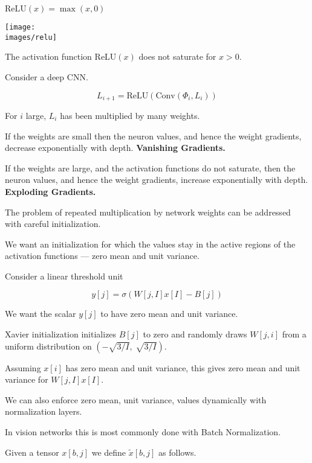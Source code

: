 {$\mathrm{ReLU}(x) = \max(x,0)$

\vfill
\centerline{\texttt{[image: \\images/relu]}}

\vfill
The activation function $\mathrm{ReLU}(x)$ does not saturate for $x > 0$.


Consider a deep CNN.

$$L_{i+1} = \mathrm{ReLU}(\mathrm{Conv}(\Phi_i,L_i))$$

\vfill
For $i$ large, $L_i$ has been multiplied by many weights.

\vfill
If the weights are small then the neuron values, and hence the weight gradients, decrease exponentially with depth. {\bf Vanishing Gradients.}

\vfill
If the weights are large, and the activation functions do not saturate, then the neuron values, and hence the weight gradients,
increase exponentially with depth. {\bf Exploding Gradients.}


The problem of repeated multiplication by network weights can be addressed with careful initialization.

\vfill
We want an initialization for which the values stay in the active regions of the activation functions --- zero mean and unit variance.



Consider a linear threshold unit

\vfill
$$y[j] = \sigma(W[j,I]x[I] - B[j])$$

\vfill
We want the scalar $y[j]$ to have zero mean and unit variance.

\vfill
Xavier initialization initializes $B[j]$ to zero and randomly draws $W[j,i]$ from a uniform distribution on $\left(-\sqrt{3/I},\;\sqrt{3/I}\right)$.

\vfill
Assuming $x[i]$ has zero mean and unit variance, this gives zero mean and unit variance for $W[j,I]x[I]$.


We can also enforce zero mean, unit variance, values dynamically with normalization layers.

\vfill
In vision networks this is most commonly done with Batch Normalization.

Given a tensor $x[b,j]$ we define $\tilde{x}[b,j]$ as follows.

}
